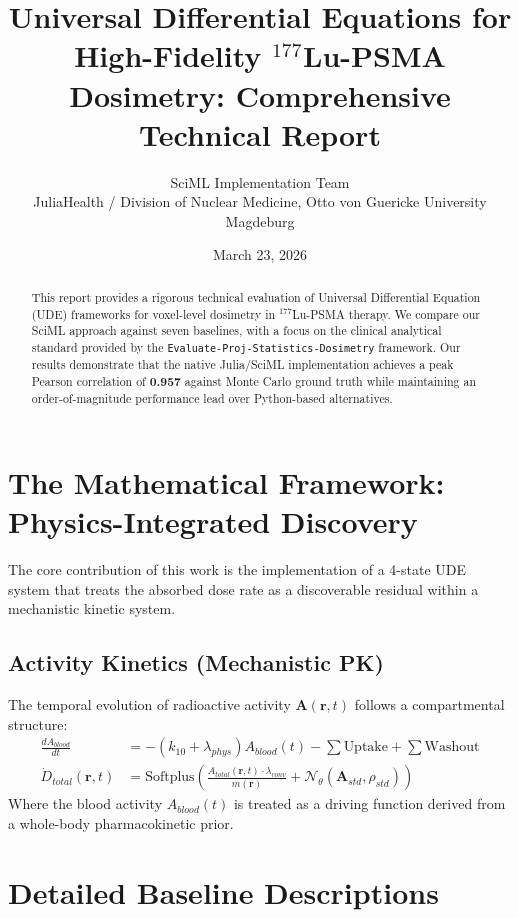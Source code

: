 \documentclass[11pt,a4paper]{article}
\title{\textbf{Universal Differential Equations for High-Fidelity $^{177}$Lu-PSMA Dosimetry: Comprehensive Technical Report}}
\author{SciML Implementation Team \\ \small{JuliaHealth / Division of Nuclear Medicine, Otto von Guericke University Magdeburg}}
\date{March 23, 2026}
\begin{document}
\maketitle

\begin{abstract}
This report provides a rigorous technical evaluation of Universal Differential Equation (UDE) frameworks for voxel-level dosimetry in $^{177}$Lu-PSMA therapy. We compare our SciML approach against seven baselines, with a focus on the clinical analytical standard provided by the \texttt{Evaluate-Proj-Statistics-Dosimetry} framework. Our results demonstrate that the native Julia/SciML implementation achieves a peak Pearson correlation of \textbf{0.957} against Monte Carlo ground truth while maintaining an order-of-magnitude performance lead over Python-based alternatives.
\end{abstract}

\section{The Mathematical Framework: Physics-Integrated Discovery}

The core contribution of this work is the implementation of a 4-state UDE system that treats the absorbed dose rate as a discoverable residual within a mechanistic kinetic system.

\subsection{Activity Kinetics (Mechanistic PK)}
The temporal evolution of radioactive activity $\mathbf{A}(\mathbf{r}, t)$ follows a compartmental structure:
\begin{align}
    \frac{dA_{blood}}{dt} &= -(k_{10} + \lambda_{phys}) A_{blood}(t) - \sum \text{Uptake} + \sum \text{Washout} \\
    \dot{D}_{total}(\mathbf{r}, t) &= \text{Softplus} \left( \frac{A_{total}(\mathbf{r}, t) \cdot \lambda_{conv}}{m(\mathbf{r})} + \mathcal{N}_\theta(\mathbf{A}_{std}, \rho_{std}) \right)
\end{align}
Where the blood activity $A_{blood}(t)$ is treated as a driving function derived from a whole-body pharmacokinetic prior.

\section{Detailed Baseline Descriptions}
\end{document}
